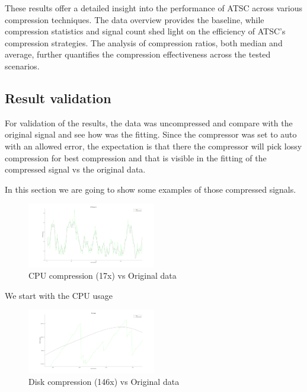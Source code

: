 \documentclass[conference]{IEEEtran}
\begin{document}
\vspace{10pt}
These results offer a detailed insight into the performance of ATSC across various compression techniques. The data overview provides the baseline, while compression statistics and signal count shed light on the efficiency of ATSC's compression strategies. The analysis of compression ratios, both median and average, further quantifies the compression effectiveness across the tested scenarios. 
 
\subsection{Result validation}

For validation of the results, the data was uncompressed and compare with the original signal and see how was the fitting. Since the compressor was set to auto with an allowed error, the expectation is that there the compressor will pick lossy compression for best compression and that is visible in the fitting of the compressed signal vs the original data.

In this section we are going to show some examples of those compressed signals.

\begin{figure}[h]
  \centering
  \includegraphics[width=0.5\textwidth]{cpu-usage-validation.png}
  \caption{CPU compression (17x) vs Original data}
  \label{cpu}
\end{figure}

We start with the CPU usage

\begin{figure}[h]
    \centering
    \includegraphics[width=0.5\textwidth]{disk-usage-validation.png}
    \caption{Disk compression (146x) vs Original data}
    \label{Disk}
  \end{figure}
\end{document}
